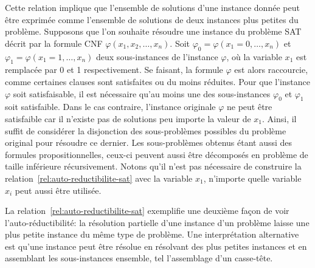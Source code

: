 Cette relation implique que l'ensemble de solutions d'une instance donnée peut être exprimée comme l'ensemble de solutions de deux instances plus petites du problème. Supposons que l'on souhaite résoudre une instance du problème SAT décrit par la formule CNF $\varphi(x_{1}, x_{2}, \dots, x_{n})$. Soit $\varphi_{0} = \varphi(x_{1}=0, \dots, x_{n})$ et $\varphi_{1} = \varphi(x_{1}=1, \dots, x_{n})$ deux sous-instances de l'instance $\varphi$, où la variable $x_{1}$ est remplacée par 0 et 1 respectivement. Se faisant, la formule $\varphi$ est alors raccourcie, comme certaines clauses sont satisfaites ou du moins réduites. Pour que l'instance $\varphi$ soit satisfaisable, il est nécessaire qu'au moins une des sous-instances $\varphi_{0}$ et $\varphi_{1}$ soit satisfaible. Dans le cas contraire, l'instance originale $\varphi$ ne peut être satisfaible car il n'existe pas de solutions peu importe la valeur de $x_{1}$. Ainsi, il suffit de considérer la disjonction des sous-problèmes possibles du problème original pour résoudre ce dernier. Les sous-problèmes obtenus étant aussi des formules propositionnelles, ceux-ci peuvent aussi être décomposés en problème de taille inférieure récursivement. Notons qu'il n'est pas nécessaire de construire la relation~\ref{rel:auto-reductibilite-sat} avec la variable $x_{1}$, n'importe quelle variable $x_{i}$ peut aussi être utilisée. 


La relation~\ref{rel:auto-reductibilite-sat} exemplifie une deuxième façon de voir l'auto-réductibilité: la résolution partielle d'une instance d'un problème laisse une plus petite instance du même type de problème. Une interprétation alternative est qu'une instance peut être résolue en résolvant des plus petites instances et en assemblant les sous-instances ensemble, tel l'assemblage d'un casse-tête. 

